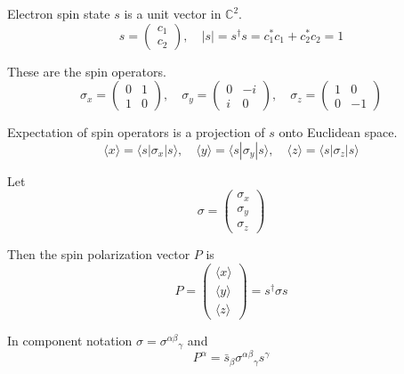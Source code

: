 \documentclass[12pt]{article}
\begin{document}
Electron spin state $s$ is a unit vector in $\mathbb{C}^2$.
\begin{equation*}
s=\begin{pmatrix}c_1\\c_2\end{pmatrix},
\quad
|s|=s^\dag s=c_1^*c_1+c_2^*c_2=1
\end{equation*}

These are the spin operators.
\begin{equation*}
\sigma_x=\begin{pmatrix}0&1\\1&0\end{pmatrix},
\quad
\sigma_y=\begin{pmatrix}0&-i\\i&0\end{pmatrix},
\quad
\sigma_z=\begin{pmatrix}1&0\\0&-1\end{pmatrix}
\end{equation*}

Expectation of spin operators is a projection of $s$ onto Euclidean space.
\begin{equation*}
\langle x\rangle=\langle s|\sigma_x|s\rangle,
\quad
\langle y\rangle=\langle s|\sigma_y|s\rangle,
\quad
\langle z\rangle=\langle s|\sigma_z|s\rangle
\end{equation*}

Let
\begin{equation*}
\sigma=\begin{pmatrix}\sigma_x\\\sigma_y\\\sigma_z\end{pmatrix}
\end{equation*}

Then the spin polarization vector $P$ is
\begin{equation*}
P=\begin{pmatrix}\langle x\rangle\\\langle y\rangle\\\langle z\rangle\end{pmatrix}
=s^\dag\sigma s
\end{equation*}

In component notation $\sigma=\sigma^{\alpha\beta}{}_\gamma$ and
\begin{equation*}
P^\alpha=\bar s_\beta\sigma^{\alpha\beta}{}_\gamma s^\gamma
\end{equation*}
\end{document}
